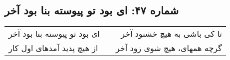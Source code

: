\begin{center}
\section*{شماره ۴۷: ای بود تو پیوسته بنا بود آخر}
\label{sec:047}
\begin{longtable}{l p{0.5cm} r}
ای بود تو پیوسته بنا بود آخر
&&
تا کی باشی به هیچ خشنود آخر
\\
از هیچ پدید آمدهای اول کار
&&
گرچه همهای، هیچ شوی زود آخر
\\
\end{longtable}
\end{center}
